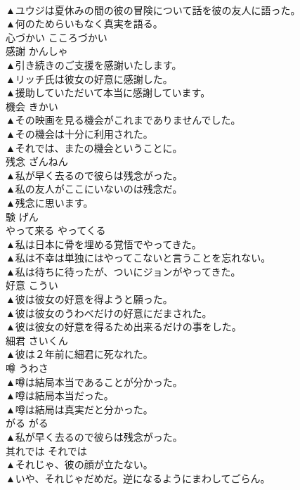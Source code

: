 \documentclass[8pt]{extreport}
\begin{document}
\begin{CJK}{UTF8}{min}
\\	▲ユウジは夏休みの間の彼の冒険について話を彼の友人に語った。 
\\	▲何のためらいもなく真実を語る。 
\\	心づかい	こころづかい	
\\	感謝	かんしゃ	
\\	▲引き続きのご支援を感謝いたします。 
\\	▲リッチ氏は彼女の好意に感謝した。 
\\	▲援助していただいて本当に感謝しています。 
\\	機会	きかい	
\\	▲その映画を見る機会がこれまでありませんでした。 
\\	▲その機会は十分に利用された。 
\\	▲それでは、またの機会ということに。 
\\	残念	ざんねん	
\\	▲私が早く去るので彼らは残念がった。 
\\	▲私の友人がここにいないのは残念だ。 
\\	▲残念に思います。 
\\	験	げん	
\\	やって来る	やってくる	
\\	▲私は日本に骨を埋める覚悟でやってきた。 
\\	▲私は不幸は単独にはやってこないと言うことを忘れない。 
\\	▲私は待ちに待ったが、ついにジョンがやってきた。 
\\	好意	こうい	
\\	▲彼は彼女の好意を得ようと願った。 
\\	▲彼は彼女のうわべだけの好意にだまされた。 
\\	▲彼は彼女の好意を得るため出来るだけの事をした。 
\\	細君	さいくん	
\\	▲彼は２年前に細君に死なれた。 
\\	噂	うわさ	
\\	▲噂は結局本当であることが分かった。 
\\	▲噂は結局本当だった。 
\\	▲噂は結局は真実だと分かった。 
\\	がる	がる	
\\	▲私が早く去るので彼らは残念がった。 
\\	其れでは	それでは	
\\	▲それじゃ、彼の顔が立たない。 
\\	▲いや、それじゃだめだ。逆になるようにまわしてごらん。 

\end{CJK}
\end{document}
